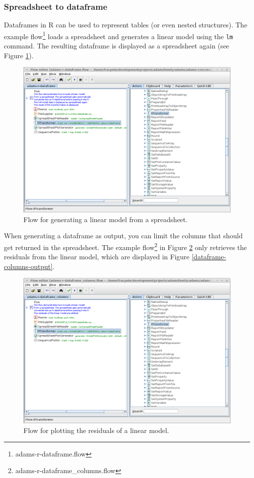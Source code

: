 \documentclass[a4paper]{book}
\begin{document}
\subsubsection{Spreadsheet to dataframe}
Dataframes in R can be used to represent tables (or even nested structures).
The example flow\footnote{adams-r-dataframe.flow} loads a spreadsheet and
generates a linear model using the \texttt{lm} command. The resulting 
dataframe is displayed as a spreadsheet again (see Figure \ref{dataframe-flow}).
\begin{figure}[ht]
	\centering
	\includegraphics[width=\textwidth]{images/dataframe-flow.png}
	\caption{Flow for generating a linear model from a spreadsheet.}
	\label{dataframe-flow}
\end{figure}
When generating a dataframe as output, you can limit the columns that should
get returned in the spreadsheet. The example flow\footnote{adams-r-dataframe\_columns.flow}
in Figure \ref{dataframe-columns-flow} only retrieves the residuals from the
linear model, which are displayed in Figure \ref{dataframe-columns-output}.
\begin{figure}[ht]
	\centering
	\includegraphics[width=\textwidth]{images/dataframe-columns-flow.png}
	\caption{Flow for plotting the residuals of a linear model.}
	\label{dataframe-columns-flow}
\end{figure}
\end{document}

